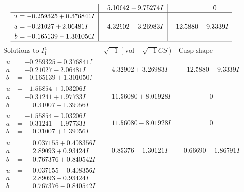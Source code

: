 \documentclass[1p]{elsarticle_modified}
\theoremstyle{definition}
\newcommand{\I}{\sqrt{-1}}
\begin{document}
$$\begin{array}{c|c|c}
 & \phantom{-}5.10642 - 9.75274 I & \phantom{-0.000000 } 0 \\ \hline\begin{aligned}
u &= -0.259325 + 0.376841 I \\
a &= -0.21027 + 2.06481 I \\
b &= -0.165139 - 1.301050 I\end{aligned}
 & \phantom{-}4.32902 - 3.26983 I & \phantom{-}12.5880 + 9.3339 I\\
 \hline 
 \end{array}$$\newpage$$\begin{array}{c|c|c}  
\text{Solutions to }I^u_{1}& \I (\text{vol} + \sqrt{-1}CS) & \text{Cusp shape}\\
 \hline 
\begin{aligned}
u &= -0.259325 - 0.376841 I \\
a &= -0.21027 - 2.06481 I \\
b &= -0.165139 + 1.301050 I\end{aligned}
 & \phantom{-}4.32902 + 3.26983 I & \phantom{-}12.5880 - 9.3339 I \\ \hline\begin{aligned}
u &= -1.55854 + 0.03206 I \\
a &= -0.31241 + 1.97733 I \\
b &= \phantom{-}0.31007 - 1.39056 I\end{aligned}
 & \phantom{-}11.56080 + 8.01928 I & \phantom{-0.000000 } 0 \\ \hline\begin{aligned}
u &= -1.55854 - 0.03206 I \\
a &= -0.31241 - 1.97733 I \\
b &= \phantom{-}0.31007 + 1.39056 I\end{aligned}
 & \phantom{-}11.56080 - 8.01928 I & \phantom{-0.000000 } 0 \\ \hline\begin{aligned}
u &= \phantom{-}0.037155 + 0.408356 I \\
a &= \phantom{-}2.89093 + 0.93424 I \\
b &= \phantom{-}0.767376 + 0.840542 I\end{aligned}
 & \phantom{-}0.85376 - 1.30121 I & -0.66690 - 1.86791 I \\ \hline\begin{aligned}
u &= \phantom{-}0.037155 - 0.408356 I \\
a &= \phantom{-}2.89093 - 0.93424 I \\
b &= \phantom{-}0.767376 - 0.840542 I\end{aligned}

\end{array}$$
\end{document}
